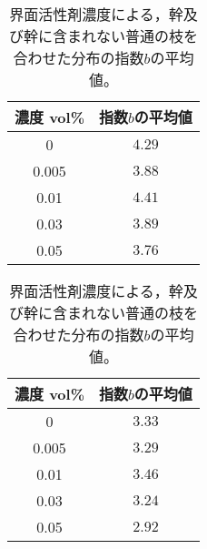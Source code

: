\documentclass[autodetect-engine,dvi=dvipdfmx,a4paper,ja=standard,oneside,openany,11pt]{bxjsbook}
\begin{document}
\begin{table}[htbp]
  \begin{minipage}{0.45\textwidth}
    \centering
    \caption{界面活性剤濃度による，普通の枝の分布の指数$b$の平均値。}
    \begin{tabular}{|c|c|}
      \hline
      濃度 vol\% & 指数$b$の平均値 \\ \hline\hline
      0        & $4.29$    \\ \hline
      0.005    & $3.88$    \\ \hline
      0.01     & $4.41$    \\ \hline
      0.03     & $3.89$    \\ \hline
      0.05     & $3.76$    \\
      \hline
    \end{tabular}
    \label{tab:brnch_len_exp}
  \end{minipage}
  \hfill
  \begin{minipage}{0.45\textwidth}
    \centering
    \caption{界面活性剤濃度による，幹及び幹に含まれない普通の枝を合わせた分布の指数$b$の平均値。}
    \begin{tabular}{|c|c|}
      \hline
      濃度 vol\% & 指数$b$の平均値 \\ \hline\hline
      0        & $3.33$    \\ \hline
      0.005    & $3.29$    \\ \hline
      0.01     & $3.46$    \\ \hline
      0.03     & $3.24$    \\ \hline
      0.05     & $2.92$    \\
      \hline
    \end{tabular}
    \label{tab:branch_len_exp_edited}
  \end{minipage}
\end{table}
\end{document}
